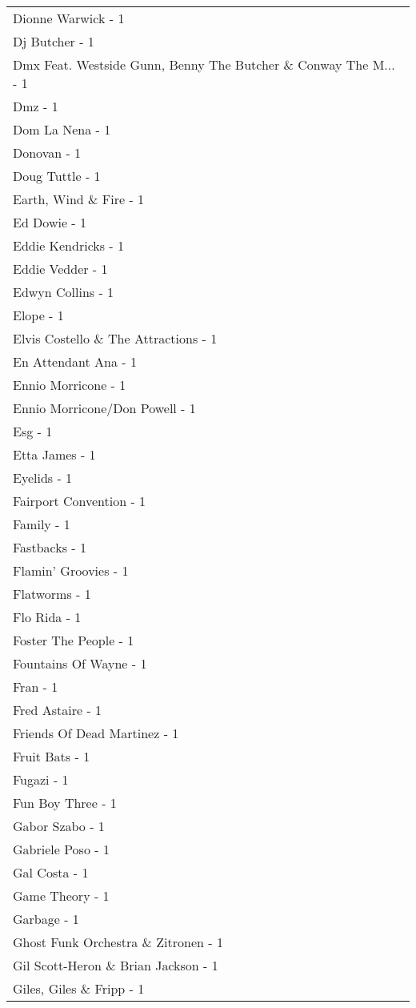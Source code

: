 \documentclass[
]{article}
\begin{document}
\begin{longtable}{l}
Dionne Warwick - 1 \\ 
Dj Butcher - 1 \\ 
Dmx Feat. Westside Gunn, Benny The Butcher \& Conway The M... - 1 \\ 
Dmz - 1 \\ 
Dom La Nena - 1 \\ 
Donovan - 1 \\ 
Doug Tuttle - 1 \\ 
Earth, Wind \& Fire - 1 \\ 
Ed Dowie - 1 \\ 
Eddie Kendricks - 1 \\ 
Eddie Vedder - 1 \\ 
Edwyn Collins - 1 \\ 
Elope - 1 \\ 
Elvis Costello \& The Attractions - 1 \\ 
En Attendant Ana - 1 \\ 
Ennio Morricone - 1 \\ 
Ennio Morricone/Don Powell - 1 \\ 
Esg - 1 \\ 
Etta James - 1 \\ 
Eyelids - 1 \\ 
Fairport Convention - 1 \\ 
Family - 1 \\ 
Fastbacks - 1 \\ 
Flamin’ Groovies - 1 \\ 
Flatworms - 1 \\ 
Flo Rida - 1 \\ 
Foster The People - 1 \\ 
Fountains Of Wayne - 1 \\ 
Fran - 1 \\ 
Fred Astaire - 1 \\ 
Friends Of Dead Martinez - 1 \\ 
Fruit Bats - 1 \\ 
Fugazi - 1 \\ 
Fun Boy Three - 1 \\ 
Gabor Szabo - 1 \\ 
Gabriele Poso - 1 \\ 
Gal Costa - 1 \\ 
Game Theory - 1 \\ 
Garbage - 1 \\ 
Ghost Funk Orchestra \& Zitronen - 1 \\ 
Gil Scott-Heron \& Brian Jackson - 1 \\ 
Giles, Giles \& Fripp - 1 \\ 

\end{longtable}
\end{document}

